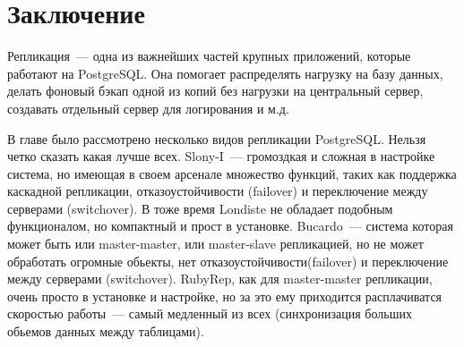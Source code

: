 \section{Заключение}
Репликация~--- одна из важнейших частей крупных приложений, которые работают на PostgreSQL. Она помогает 
распределять нагрузку на базу данных, делать фоновый бэкап одной из копий без нагрузки на центральный сервер, 
создавать отдельный сервер для логирования и м.д.

В главе было рассмотрено несколько видов репликации PostgreSQL. Нельзя четко сказать какая лучше всех. 
Slony-I~--- громоздкая и сложная в настройке система, 
но имеющая в своем арсенале множество функций, таких как поддержка каскадной репликации, отказоустойчивости (failover) 
и переключение между серверами (switchover). В тоже время Londiste не обладает подобным функционалом, 
но компактный и прост в установке. Bucardo~--- система которая может быть или master-master, или 
master-slave репликацией, но не может обработать огромные обьекты, нет отказоустойчивости(failover) 
и переключение между серверами (switchover). RubyRep, как для master-master репликации, 
очень просто в установке и настройке, но за это ему приходится расплачиватся скоростью работы~--- самый 
медленный из всех (синхронизация больших обьемов данных между таблицами).
